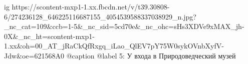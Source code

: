  
 
 
 
 

\ifcmt
  ig https://scontent-mxp1-1.xx.fbcdn.net/v/t39.30808-6/274236128_646225116687155_4054539588337038929_n.jpg?_nc_cat=109&ccb=1-5&_nc_sid=5cd70e&_nc_ohc=sHs3XDVe9xMAX_jh-0X&_nc_ht=scontent-mxp1-1.xx&oh=00_AT_jRaCkQfRxgq_iLao_QlEV7pY75W0sykOVnbXyfV-Jdw&oe=621568A0
  @caption @label 5: У входа в Природоведческий музей
\fi
